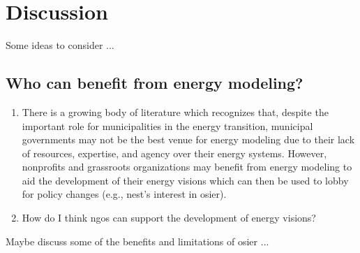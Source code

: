 \section{Discussion}

Some ideas to consider ...

\subsection{Who can benefit from energy modeling?}

\begin{enumerate}
    \item There is a growing body of literature which recognizes that, despite
    the important role for municipalities in the energy transition, municipal
    governments may not be the best venue for energy modeling due to their lack
    of resources, expertise, and agency over their energy systems. However,
    nonprofits and grassroots organizations may benefit from energy modeling to
    aid the development of their energy visions which can then be used to lobby
    for policy changes (e.g., \ac{nest}'s interest in \ac{osier}).
    \item How do I think \acp{ngo} can support the development of energy visions?
\end{enumerate}

Maybe discuss some of the benefits and limitations of \ac{osier} ...


